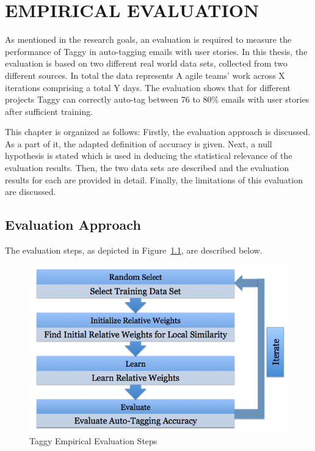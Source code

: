\fancyhead[RO,LE]{\thepage}
\fancyfoot{} 
\chapter{EMPIRICAL EVALUATION}
\label{ch:evaluation}
As mentioned in the research goals, an evaluation is required to measure the performance of Taggy in auto-tagging emails with user stories. In this thesis, the evaluation is based on two different real world data sets, collected from two different sources. In total the data represents A agile teams' work across X iterations comprising a total Y days. The evaluation shows that for different projects Taggy can correctly auto-tag between 76 to 80\% emails with user stories after sufficient training.

This chapter is organized as follows: Firstly, the evaluation approach is discussed. As a part of it, the adapted definition of accuracy is given. Next, a null hypothesis is stated which is used in deducing the statistical relevance of the evaluation results. Then, the two data sets are described and the evaluation results for each are provided in detail. Finally, the limitations of this evaluation are discussed.

\section{Evaluation Approach}
The evaluation steps, as depicted in Figure~\ref{fig:evaluation}, are described below.

\begin{figure}[tb]
	\centering
	\includegraphics[width=\textwidth]{Evaluation.png}
    \caption{Taggy Empirical Evaluation Steps}
	\label{fig:evaluation}
\end{figure}


